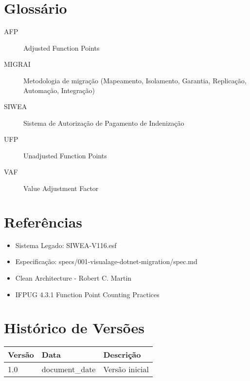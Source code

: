 \section{Glossário}
\begin{description}
\item[AFP] Adjusted Function Points
\item[MIGRAI] Metodologia de migração (Mapeamento, Isolamento, Garantia, Replicação, Automação, Integração)
\item[SIWEA] Sistema de Autorização de Pagamento de Indenização
\item[UFP] Unadjusted Function Points
\item[VAF] Value Adjustment Factor
\end{description}

\section{Referências}
\begin{itemize}
\item Sistema Legado: SIWEA-V116.esf
\item Especificação: specs/001-visualage-dotnet-migration/spec.md
\item Clean Architecture - Robert C. Martin
\item IFPUG 4.3.1 Function Point Counting Practices
\end{itemize}

\section{Histórico de Versões}
\begin{table}[H]
\centering
\begin{tabular}{lll}
\toprule
Versão & Data & Descrição \\
\midrule
1.0 & {{ document_date }} & Versão inicial \\
\bottomrule
\end{tabular}
\end{table}